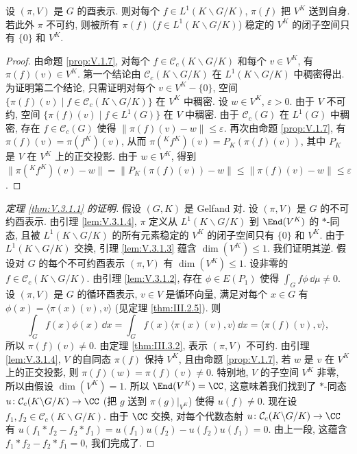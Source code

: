 \begin{lemma}[$V^K$ 上的作用]
\label{lem:V.3.1.4}
设 $(\pi, V)$ 是 $G$ 的酉表示. 则对每个 $f \in L^1(K\backslash G/K)$, $\pi(f)$ 把 $V^K$ 送到自身. 若此外 $\pi$ 不可约, 则被所有 $\pi(f)$ ($f \in L^1(K\backslash G/K)$) 稳定的 $V^K$ 的闭子空间只有 $\{0\}$ 和 $V^K$.
\end{lemma}

\begin{proof}
由命题 \ref{prop:V.1.7}, 对每个 $f \in \mathcal{C}_c(K\backslash G/K)$ 和每个 $v \in V^K$, 有 $\pi(f)(v) \in V^K$. 第一个结论由 $\mathcal{C}_c(K\backslash G/K)$ 在 $L^1(K\backslash G/K)$ 中稠密得出.
为证明第二个结论, 只需证明对每个 $v \in V^K - \{0\}$, 空间 $\{\pi(f)(v) \mid f \in \mathcal{C}_c(K\backslash G/K)\}$ 在 $V^K$ 中稠密. 设 $w \in V^K$, $\varepsilon > 0$. 由于 $V$ 不可约, 空间 $\{\pi(f)(v) \mid f \in L^1(G)\}$ 在 $V$ 中稠密. 由于 $\mathcal{C}_c(G)$ 在 $L^1(G)$ 中稠密, 存在 $f \in \mathcal{C}_c(G)$ 使得 $\|\pi(f)(v) - w\| \leq \varepsilon$. 再次由命题 \ref{prop:V.1.7}, 有 $\pi(f)(v) = \pi(f^K)(v)$, 从而 $\pi({}^Kf^K)(v) = P_K(\pi(f)(v))$, 其中 $P_K$ 是 $V$ 在 $V^K$ 上的正交投影. 由于 $w \in V^K$, 得到 $\|\pi({}^Kf^K)(v) - w\| = \|P_K(\pi(f)(v)) - w\| \leq \|\pi(f)(v) - w\| \leq \varepsilon$.
\end{proof}

\begin{proof}[定理 \ref{thm:V.3.1.1} 的证明]
假设 $(G, K)$ 是 Gelfand 对. 设 $(\pi, V)$ 是 $G$ 的不可约酉表示. 由引理 \ref{lem:V.3.1.4}, $\pi$ 定义从 $L^1(K\backslash G/K)$ 到 $\End(V^K)$ 的 $*$-同态, 且被 $L^1(K\backslash G/K)$ 的所有元素稳定的 $V^K$ 的闭子空间只有 $\{0\}$ 和 $V^K$. 由于 $L^1(K\backslash G/K)$ 交换, 引理 \ref{lem:V.3.1.3} 蕴含 $\dim(V^K) \leq 1$.
我们证明其逆. 假设对 $G$ 的每个不可约酉表示 $(\pi, V)$ 有 $\dim(V^K) \leq 1$. 设非零的 $f \in \mathcal{C}_c(K\backslash G/K)$. 由引理 \ref{lem:V.3.1.2}, 存在 $\phi \in E(P_1)$ 使得 $\int_G f\phi\,\dd\mu \neq 0$. 设 $(\pi, V)$ 是 $G$ 的循环酉表示, $v \in V$ 是循环向量, 满足对每个 $x \in G$ 有 $\phi(x) = \langle \pi(x)(v), v \rangle$ (见定理 \ref{thm:III.2.5}). 则
\[
\int_G f(x)\phi(x)\,\dd x = \int_G f(x)\langle \pi(x)(v), v \rangle\,\dd x = \langle \pi(f)(v), v \rangle,
\]
所以 $\pi(f)(v) \neq 0$. 由定理 \ref{thm:III.3.2}, 表示 $(\pi, V)$ 不可约. 由引理 \ref{lem:V.3.1.4}, $V$ 的自同态 $\pi(f)$ 保持 $V^K$, 且由命题 \ref{prop:V.1.7}, 若 $w$ 是 $v$ 在 $V^K$ 上的正交投影, 则 $\pi(f)(w) = \pi(f)(v) \neq 0$. 特别地, $V$ 的子空间 $V^K$ 非零, 所以由假设 $\dim(V^K) = 1$. 所以 $\End(V^K) = \CC$, 这意味着我们找到了 $*$-同态 $u \colon \mathcal{C}_c(K\backslash G/K) \to \CC$ (把 $g$ 送到 $\pi(g)|_{V^K}$) 使得 $u(f) \neq 0$.
现在设 $f_1, f_2 \in \mathcal{C}_c(K\backslash G/K)$. 由于 $\CC$ 交换, 对每个代数态射 $u \colon \mathcal{C}_c(K\backslash G/K) \to \CC$ 有 $u(f_1 * f_2 - f_2 * f_1) = u(f_1)u(f_2) - u(f_2)u(f_1) = 0$. 由上一段, 这蕴含 $f_1 * f_2 - f_2 * f_1 = 0$, 我们完成了.
\end{proof}

